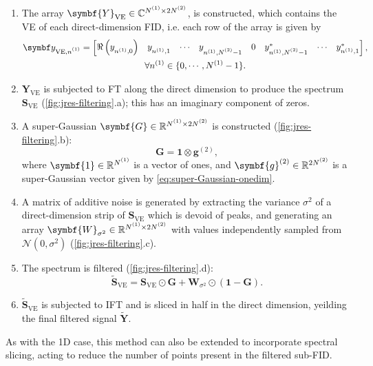 \begin{enumerate}
    \item The array $\symbf{Y}_{\text{VE}} \in \mathbb{C}^{\None \times 2
        \Ntwo}$, is constructed, which contains the \ac{VE} of each
        direct-dimension \ac{FID}, i.e. each row of the array is given by
        \begin{equation}
            \begin{gathered}
            \by_{\text{VE},\none} =
                \begin{bmatrix}
                    \Re\left(y_{n^{(1)}, 0}^{\vphantom{*}}\right) &
                    y_{n^{(1)}, 1}^{\vphantom{*}} &
                    \cdots &
                    y_{n^{(1)}, \Ntwo - 1}^{\vphantom{*}} &
                    0 &
                    y_{n^{(1)}, \Ntwo - 1}^* &
                    \cdots &
                    y_{n^{(1)}, 1}^*
                \end{bmatrix},\\
                \forall n^{(1)} \in \lbrace 0, \cdots, N^{(1)} - 1 \rbrace.
            \end{gathered}
        \end{equation}
    \item $\symbf{Y}_{\text{VE}}$ is subjected to \ac{FT} along the direct
        dimension to produce the spectrum  $\symbf{S}_{\text{VE}}$
        (\cref{fig:jres-filtering}.a); this has an imaginary component of
        zeros.
    \item A super-Gaussian $\symbf{G} \in \mathbb{R}^{\None \times 2 \Ntwo}$ is
        constructed
        (\cref{fig:jres-filtering}.b):
        \begin{equation}
            \symbf{G} = \symbf{1} \otimes \symbf{g}^{(2)},
        \end{equation}
        where $\symbf{1} \in \mathbb{R}^{\None}$ is a vector of ones, and
        $\symbf{g}^{(2)} \in \mathbb{R}^{2\Ntwo}$ is a super-Gaussian vector
        given by \cref{eq:super-Gaussian-onedim}.
    \item A matrix of additive noise is generated by extracting the variance
        $\sigma^2$ of a direct-dimension strip of $\symbf{S}_{\text{VE}}$ which
        is devoid of peaks, and generating an array $\symbf{W}_{\sigma^2} \in
        \mathbb{R}^{\None \times 2 \Ntwo}$ with values independently sampled
        from $\mathcal{N}(0, \sigma^2)$ (\cref{fig:jres-filtering}.c).
    \item The spectrum is filtered (\cref{fig:jres-filtering}.d):
        \begin{equation}
            \widetilde{\symbf{S}}_{\text{VE}} = \symbf{S}_{\text{VE}} \odot
            \symbf{G} + \symbf{W}_{\sigma^2} \odot (\symbf{1} - \symbf{G}).
        \end{equation}
    \item $\widetilde{\symbf{S}}_{\text{VE}}$ is subjected to \ac{IFT} and is
        sliced in half in the direct dimension, yeilding the final filtered
        signal $\widetilde{\symbf{Y}}$.
\end{enumerate}
As with the \ac{1D} case, this method can also be extended to
incorporate spectral slicing, acting to reduce the number of points present in
the filtered sub-\ac{FID}.

